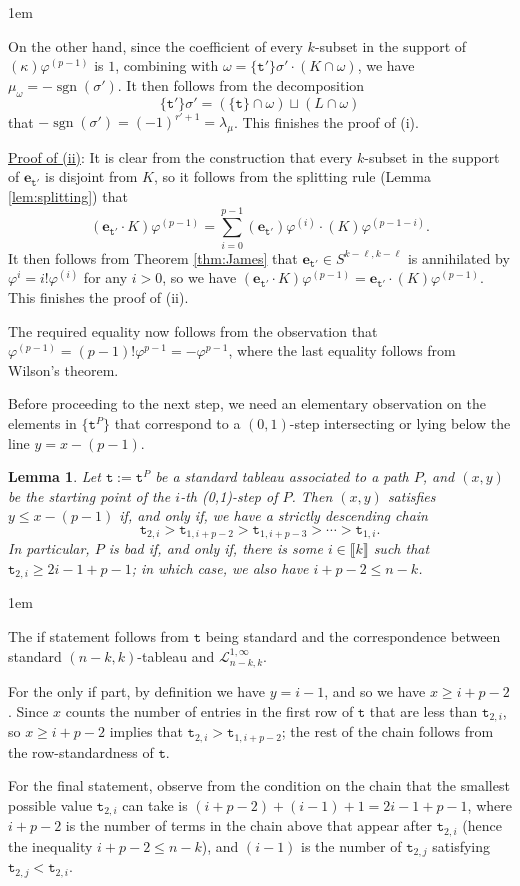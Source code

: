 \documentclass[a4paper]{amsart}
\makeatletter
\numberwithin{equation}{subsection}
\newtheorem{lemma}[theorem]{Lemma}
\theoremstyle{definition}
\newcommand{\interval}[1]{\llbracket #1 \rrbracket}
\DeclareMathOperator{\sgn}{\mathrm{sgn}}
\newcommand{\bfe}{\pmb{e}}
\newcommand{\tbx}{\mathtt{t}}
\renewenvironment{proof}[1][\proofname]{\par
	\pushQED{\qed}%
	\normalfont \topsep0\p@\@plus6\p@ \labelsep1em\relax
	\trivlist
	\item[\hskip\labelsep\bfseries #1]\ignorespaces
	\mbox{}%
}{
	\popQED\endtrivlist\@endpefalse
}
\numberwithin{equation}{subsection}
\makeatother
\begin{document}
\begin{proof}
On the other hand, since the coefficient of every $k$-subset in the support of $(\kappa)\varphi^{(p-1)}$ is $1$, combining with $\omega = \{\tbx'\}\sigma'\cdot (K\cap\omega)$, we have $\mu_\omega = -\sgn(\sigma')$.
It then follows from the decomposition 
\[
\{\tbx'\}\sigma' = (\{\tbx\}\cap \omega) \sqcup (L\cap \omega)
\]
that $-\sgn(\sigma')=(-1)^{r'+1} = \lambda_\mu$.
This finishes the proof of (i).

\underline{Proof of (ii)}:
It is clear from the construction that every $k$-subset in the support of $\bfe_{\tbx'}$ is disjoint from $K$, so it follows from the splitting rule (Lemma \ref{lem:splitting}) that 
\[
(\bfe_{\tbx'}\cdot K)\varphi^{(p-1)} = \sum_{i=0}^{p-1} (\bfe_{\tbx'})\varphi^{(i)}\cdot (K)\varphi^{(p-1-i)}.
\]
It then follows from Theorem \ref{thm:James} that $\bfe_{\tbx'}\in S^{k-\ell,k-\ell}$ is annihilated by $\varphi^i = i! \varphi^{(i)}$ for any $i>0$, so we have $(\bfe_{\tbx'}\cdot K)\varphi^{(p-1)} = \bfe_{\tbx'}\cdot(K)\varphi^{(p-1)}$.  This finishes the proof of (ii).

The required equality now follows from the observation that $\varphi^{(p-1)}=(p-1)!\varphi^{p-1}=-\varphi^{p-1}$, where the last equality follows from Wilson's theorem.
\end{proof}

Before proceeding to the next step, we need an elementary observation on the elements in $\{\tbx^P\}$ that correspond to a $(0,1)$-step intersecting or lying below the line $y=x-(p-1)$.
\begin{lemma}\label{lem:badpaths}
Let $\tbx:=\tbx^P$ be a standard tableau associated to a path $P$, and $(x,y)$ be the starting point of the $i$-th (0,1)-step of $P$.
Then $(x,y)$ satisfies $y\leq x-(p-1)$ if, and only if, we have a strictly descending chain
\[\tbx_{2,i} > \tbx_{1,i+p-2} > \tbx_{1,i+p-3} > \cdots > \tbx_{1,i}.\]
In particular, $P$ is bad if, and only if, there is some $i\in \interval{k}$ such that $\tbx_{2,i}\geq 2i-1+p-1$; in which case, we also have $i+p-2\leq n-k$.
\end{lemma}
\begin{proof}
The if statement follows from $\tbx$ being standard and the correspondence between standard $(n-k,k)$-tableau and $\mathcal{L}_{n-k,k}^{1,\infty}$. 

For the only if part, by definition we have $y=i-1$, and so we have $x\geq i+p-2$.
Since $x$ counts the number of entries in the first row of $\tbx$ that are less than $\tbx_{2,i}$, so $x\geq i+p-2$ implies that $\tbx_{2,i}>\tbx_{1,i+p-2}$; the rest of the chain follows from the row-standardness of $\tbx$.

For the final statement, observe from the condition on the chain that the smallest possible value $\tbx_{2,i}$ can take is $(i+p-2)+(i-1)+1 = 2i-1+p-1$, where $i+p-2$ is the number of terms in the chain above that appear after $\tbx_{2,i}$ (hence the inequality $i+p-2\leq n-k$), and $(i-1)$ is the number of $\tbx_{2,j}$ satisfying $\tbx_{2,j}<\tbx_{2,i}$.
\end{proof}
\end{document}
